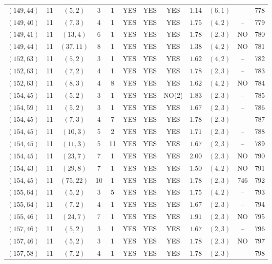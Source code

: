 \begin{longtable}{|c|c|c|c|c|c|c|c|c|c|c|c|}
$(149,44)$ & 11 & $(5,2)$ & 3 & 1 & YES & YES & YES & $1.14$ & $(6,1)$ & -- & 778\\
$(149,40)$ & 11 & $(7,3)$ & 4 & 1 & YES & YES & YES & $1.75$ & $(4,2)$ & -- & 779\\
$(149,41)$ & 11 & $(13,4)$ & 6 & 1 & YES & YES & YES & $1.78$ & $(2,3)$ & NO & 780\\
$(149,44)$ & 11 & $(37,11)$ & 8 & 1 & YES & YES & YES & $1.38$ & $(4,2)$ & NO & 781\\
$(152,63)$ & 11 & $(5,2)$ & 3 & 1 & YES & YES & YES & $1.62$ & $(4,2)$ & -- & 782\\
$(152,63)$ & 11 & $(7,2)$ & 4 & 1 & YES & YES & YES & $1.78$ & $(2,3)$ & -- & 783\\
$(152,63)$ & 11 & $(8,3)$ & 4 & 8 & YES & YES & YES & $1.62$ & $(4,2)$ & NO & 784\\
$(154,45)$ & 11 & $(5,2)$ & 3 & 1 & YES & YES & NO(2) & $1.83$ & $(2,3)$ & -- & 785\\
$(154,59)$ & 11 & $(5,2)$ & 3 & 1 & YES & YES & YES & $1.67$ & $(2,3)$ & -- & 786\\
$(154,45)$ & 11 & $(7,3)$ & 4 & 7 & YES & YES & YES & $1.78$ & $(2,3)$ & -- & 787\\
$(154,45)$ & 11 & $(10,3)$ & 5 & 2 & YES & YES & YES & $1.71$ & $(2,3)$ & -- & 788\\
$(154,45)$ & 11 & $(11,3)$ & 5 & 11 & YES & YES & YES & $1.67$ & $(2,3)$ & -- & 789\\
$(154,45)$ & 11 & $(23,7)$ & 7 & 1 & YES & YES & YES & $2.00$ & $(2,3)$ & NO & 790\\
$(154,43)$ & 11 & $(29,8)$ & 7 & 1 & YES & YES & YES & $1.50$ & $(4,2)$ & NO & 791\\
$(154,45)$ & 11 & $(75,22)$ & 10 & 1 & YES & YES & YES & $1.78$ & $(2,3)$ & 746 & 792\\
$(155,64)$ & 11 & $(5,2)$ & 3 & 5 & YES & YES & YES & $1.75$ & $(4,2)$ & -- & 793\\
$(155,64)$ & 11 & $(7,2)$ & 4 & 1 & YES & YES & YES & $1.67$ & $(2,3)$ & -- & 794\\
$(155,46)$ & 11 & $(24,7)$ & 7 & 1 & YES & YES & YES & $1.91$ & $(2,3)$ & NO & 795\\
$(157,46)$ & 11 & $(5,2)$ & 3 & 1 & YES & YES & YES & $1.67$ & $(2,3)$ & -- & 796\\
$(157,46)$ & 11 & $(5,2)$ & 3 & 1 & YES & YES & YES & $1.78$ & $(2,3)$ & NO & 797\\
$(157,58)$ & 11 & $(7,2)$ & 4 & 1 & YES & YES & YES & $1.78$ & $(2,3)$ & -- & 798\\

\end{longtable}
